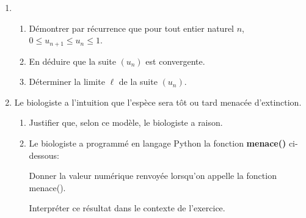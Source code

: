\begin{enumerate}[resume]
\item 
	\begin{enumerate}
		\item Démontrer par récurrence que pour tout entier naturel $n$,\, $0 \leqslant u_{n+1} \leqslant  u_n \leqslant 1$.
		\item En déduire que la suite $\left(u_n\right)$ est convergente.
		\item Déterminer la limite $\ell$ de la suite $\left(u_n\right)$.
	\end{enumerate}
\item Le biologiste a l'intuition que l'espèce sera tôt ou tard menacée d'extinction.
	\begin{enumerate}
		\item Justifier que, selon ce modèle, le biologiste a raison.
		\item Le biologiste a programmé en langage Python la fonction \textbf{menace()} ci-dessous:

\begin{center}
\end{center}

Donner la valeur numérique renvoyée lorsqu'on appelle la fonction menace(). 

Interpréter ce résultat dans le contexte de l'exercice.
	\end{enumerate}
\end{enumerate}

\bigskip

